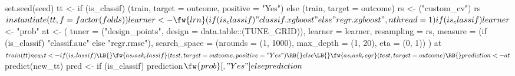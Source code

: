 set.seed(seed)
tt <- if (is_classif) \LB{}
  (train, target = outcome, positive = "Yes")
\RB{} else \LB{}
  (train, target = outcome)
\RB{}
rs <- ("custom_cv")
rs$instantiate(tt, f = factor(folds))
learner <- \fw{lrn}(if (is_classif) "classif.xgboost" else "regr.xgboost", nthread = 1)
if (is_classif) learner$ <- "prob"
at <- (
  tuner = ("design_points", design = data.table::(TUNE_GRID)),
  learner = learner,
  resampling = rs,
  measure = (if (is_classif) "classif.auc" else "regr.rmse"),
  search_space = (nrounds = (1, 1000), max_depth = (1, 20),
                    eta = (0, 1))
)
at$train(tt)
new_tt <- if (is_classif) \LB{}
  \fw{as_task_classif}(test, target = outcome, positive = "Yes")
\RB{} else \LB{}
  \fw{as_task_regr}(test, target = outcome)
\RB{}
prediction <- at$predict(new_tt)
pred <- if (is_classif) prediction$\fw{prob}[, "Yes"] else prediction$
